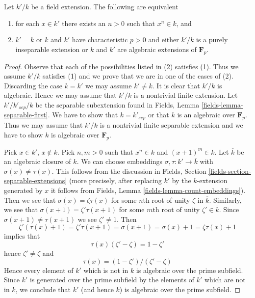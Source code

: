 \begin{lemma}
\label{lemma-powers-field}
\begin{reference}
\cite[Lemma 3.1.6]{Alper-adequate}
\end{reference}
Let $k'/k$ be a field extension. The following are equivalent
\begin{enumerate}
\item for each $x \in k'$ there exists an $n > 0$ such that $x^n \in k$, and
\item $k' = k$ or $k$ and $k'$ have characteristic $p > 0$ and
either $k'/k$ is a purely inseparable extension or
$k$ and $k'$ are algebraic extensions of $\mathbf{F}_p$.
\end{enumerate}
\end{lemma}

\begin{proof}
Observe that each of the possibilities listed in (2) satisfies (1).
Thus we assume $k'/k$ satisfies (1) and we prove that we are in
one of the cases of (2). Discarding the case $k = k'$ we may assume
$k' \not = k$. It is clear that $k'/k$ is algebraic.
Hence we may assume that $k'/k$ is a nontrivial finite extension.
Let $k'/k'_{sep}/k$ be the separable subextension
found in Fields, Lemma \ref{fields-lemma-separable-first}.
We have to show that $k = k'_{sep}$ or that $k$ is an algebraic over
$\mathbf{F}_p$. Thus we may assume that $k'/k$
is a nontrivial finite separable extension and we have to show
$k$ is algebraic over $\mathbf{F}_p$.

\medskip\noindent
Pick $x \in k'$, $x \not \in k$. Pick $n, m > 0$ such that
$x^n \in k$ and $(x + 1)^m \in k$. Let $\overline{k}$ be an
algebraic closure of $k$. We can choose embeddings
$\sigma, \tau : k' \to \overline{k}$ with $\sigma(x) \not = \tau(x)$.
This follows from the discussion in
Fields, Section \ref{fields-section-separable-extensions}
(more precisely, after replacing $k'$ by the $k$-extension
generated by $x$ it follows from
Fields, Lemma \ref{fields-lemma-count-embeddings}).
Then we see that $\sigma(x) = \zeta \tau(x)$ for some
$n$th root of unity $\zeta$ in $\overline{k}$.
Similarly, we see that $\sigma(x + 1) = \zeta' \tau(x + 1)$
for some $m$th root of unity $\zeta' \in \overline{k}$.
Since $\sigma(x + 1) \not = \tau(x + 1)$ we see $\zeta' \not = 1$.
Then
$$
\zeta' (\tau(x) + 1) =
\zeta' \tau(x + 1) =
\sigma(x + 1) =
\sigma(x) + 1 =
\zeta \tau(x) + 1
$$
implies that
$$
\tau(x) (\zeta' - \zeta) = 1 - \zeta'
$$
hence $\zeta' \not = \zeta$ and
$$
\tau(x) = (1 - \zeta')/(\zeta' - \zeta)
$$
Hence every element of $k'$ which is not in $k$ is algebraic over the prime
subfield. Since $k'$ is generated over the prime subfield by the elements
of $k'$ which are not in $k$, we conclude that $k'$ (and hence $k$)
is algebraic over the prime subfield.


\end{proof}
